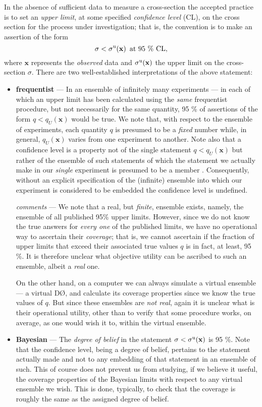 \documentclass[preprint,eqsecnum,aps]{revtex4}
\newcommand{\bx}{\mathbf{x}}
\newcommand{\sigU}{\sigma^{\rm u}}
\begin{document}
In the absence of sufficient data to measure a
cross-section the accepted practice is to set an {\em upper
limit}, at some specified {\em confidence level} (CL), on the
cross section for the process under investigation; that is, the
convention is to make an assertion of the form
\begin{equation}
\label{eq:LimitStatement}
        \sigma < \sigU(\bx) \, \, \, \mbox {at 95 \% CL},
\end{equation}
where $\bx$ represents the {\em observed} data and $\sigU(\bx)$
the upper limit on the cross-section $\sigma$. There are two
well-established interpretations of the above statement:
\begin{itemize}
\item {\bf frequentist} --- In 
an ensemble of infinitely many experiments --- in each of 
which an upper limit has been
calculated using the {\em same} frequentist procedure, but not 
necessarily for the same quantity, 95 \% of assertions
of the form $q <
q_U(\bx)$ would be true.
We note that, with respect to the ensemble of experiments, each
quantity $q$ is presumed to be a {\em fixed} number 
while, in general, $q_U(\bx)$ varies
from one experiment to another. Note also that
a confidence level is a property not of the single statement
$q < q_U(\bx)$ but rather of the ensemble of such
statements of which the statement we actually make in our
{\em single} experiment is presumed to
be a member \cite{Neyman}. Consequently, without an explicit
specification of the (infinite) ensemble into which our experiment is
considered to be embedded the confidence level is undefined. 

{\em comments} ---
We note that a real, but {\em finite}, ensemble exists, namely, 
the ensemble of all published 95\% upper limits. However, since we do not
know the true answers for {\em every one} of the published limits, we have
no operational way to ascertain their {\em coverage}; that is,
we cannot ascertain if the fraction of upper limits that exceed their
associated true values $q$ is in fact, at least, 95 \%. 
It is therefore unclear
what objective utility can be ascribed to such an ensemble, albeit a
{\em real} one. 

On the other hand, on a computer we can always simulate a virtual 
ensemble --- a virtual D\O , and
calculate its coverage properties since we know the true values of $q$. But
since these ensembles are {\em not real}, again it is unclear what is
their operational utility, other than to verify that some procedure works,
on average, as one would wish it to, within the virtual ensemble.
 
\item {\bf Bayesian} --- The {\em degree of belief} in the
statement $\sigma < \sigU(\bx)$ is 95 \%. Note that the confidence
level, being a degree of belief, pertains to the statement
actually made and not to any embedding of that statement in an ensemble
of such. This of course does not prevent us from studying, if we
believe it useful,
the coverage properties of the Bayesian limits with respect to any virtual
ensemble we wish. This is done, typically, to check that
the coverage is roughly the same as the assigned degree of belief.
\end{itemize}
\end{document}
